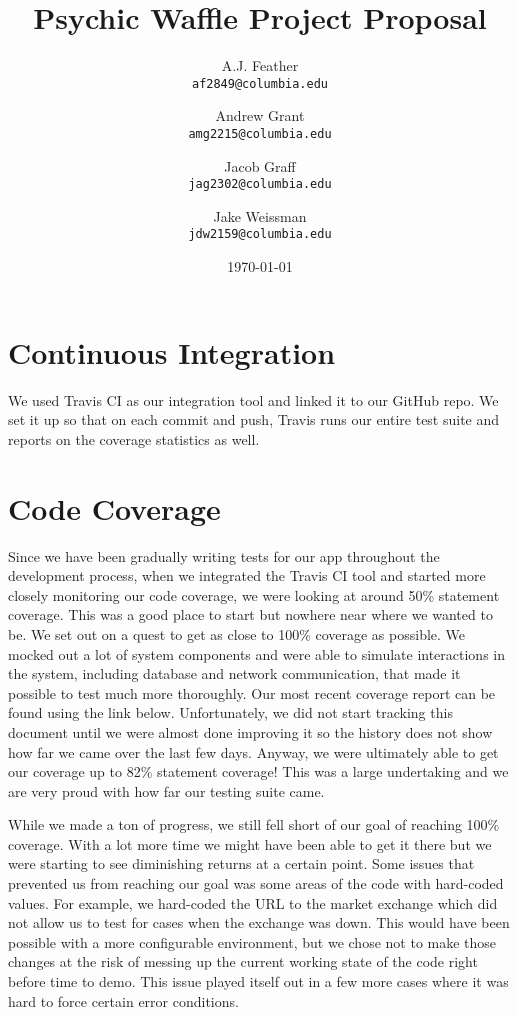 \documentclass{article}
\title{Psychic Waffle Project Proposal}
\author{
    A.J. Feather\\
    \texttt{af2849@columbia.edu}
    \and
    Andrew Grant\\
    \texttt{amg2215@columbia.edu}
    \and
    Jacob Graff\\
    \texttt{jag2302@columbia.edu}
    \and
    Jake Weissman\\
    \texttt{jdw2159@columbia.edu}
}
\date{\today}
\begin{document}
\maketitle

\section{Continuous Integration}
We used Travis CI as our integration tool and linked it to our GitHub repo. We set it up so that on each commit and push, Travis runs our entire test suite and reports on the coverage statistics as well.

\section{Code Coverage}
Since we have been gradually writing tests for our app throughout the development process, when we integrated the Travis CI tool and started more closely monitoring our code coverage, we were looking at around 50\% statement coverage. This was a good place to start but nowhere near where we wanted to be. We set out on a quest to get as close to 100\% coverage as possible. We mocked out a lot of system components and were able to simulate interactions in the system, including database and network communication, that made it possible to test much more thoroughly. Our most recent coverage report can be found using the link below. Unfortunately, we did not start tracking this document until we were almost done improving it so the history does not show how far we came over the last few days. Anyway, we were ultimately able to get our coverage up to 82\% statement coverage! This was a large undertaking and we are very proud with how far our testing suite came.

While we made a ton of progress, we still fell short of our goal of reaching 100\% coverage. With a lot more time we might have been able to get it there but we were starting to see diminishing returns at a certain point. Some issues that prevented us from reaching our goal was some areas of the code with hard-coded values. For example, we hard-coded the URL to the market exchange which did not allow us to test for cases when the exchange was down. This would have been possible with a more configurable environment, but we chose not to make those changes at the risk of messing up the current working state of the code right before time to demo. This issue played itself out in a few more cases where it was hard to force certain error conditions.
\end{document}
